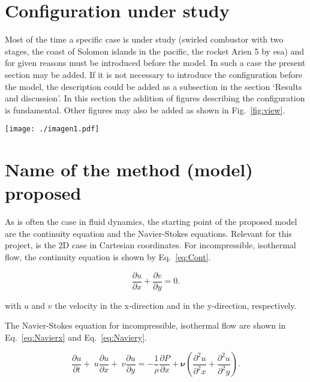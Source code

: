 \documentclass[fleqn,12pt]{NTFD} %
\begin{document}
\lipsum[1-3] %


\section{Configuration under study}


Most of the time a specific case is under study (swirled combustor with two stages, the coast of Solomon islands in the pacific, the rocket Arien 5 by esa) and for given reasons must  be introduced before the model. In such a case the present section may be added. If it is not necessary to introduce the configuration before the model, the description could be added as a subsection in the section `Results and discussion'. In this section  the addition of figures describing the configuration is fundamental. Other figures may also be added as shown in Fig.~\ref{fig:view}. 

\begin{figure*}[ht]\centering %
\texttt{[image: ./imagen1.pdf]}
\caption{Wide Picture}
\label{fig:view}
\end{figure*}



\section{Name of the method (model) proposed}

As is often the case in fluid dynamics, the starting point of the proposed model are the continuity equation and the Navier-Stokes equations. Relevant for this project, is the 2D case in Cartesian coordinates. For incompressible, isothermal flow, the continuity equation is shown by Eq.~\eqref{eq:Cont}.

\begin{equation}
\frac{\partial u}{\partial x} + \frac{\partial v}{\partial y} = 0.
\label{eq:Cont}
\end{equation}

with $u$ and $v$ the velocity in the x-direction and in the y-direction, respectively.

The Navier-Stokes equation for incompressible, isothermal flow are shown in Eq.~\eqref{eq:Navierx} and Eq.~\eqref{eq:Naviery}. 

\begin{equation}
 \frac{\partial u}{\partial t}  + \ u \frac{\partial u}{\partial x} +\ v \frac{\partial u}{\partial y} = -\frac{1}{\rho} \frac{\partial P}{\partial x} +  \boldsymbol{\nu} \left(\frac{\partial^2 u}{\partial^2 x} + \frac{\partial^2 u}{\partial^2 y} \right) .
\label{eq:Navierx}
\end{equation}
\end{document}
